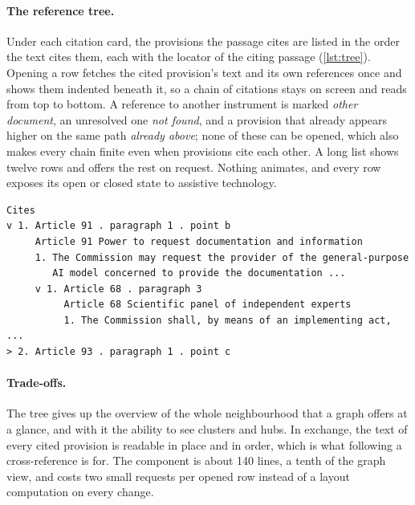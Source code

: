 \paragraph{The reference tree.} Under each citation card, the provisions the
passage cites are listed in the order the text cites them, each with the
locator of the citing passage (\cref{lst:tree}). Opening a row fetches the
cited provision's text and its own references once and shows them indented
beneath it, so a chain of citations stays on screen and reads from top to
bottom. A reference to another instrument is marked \emph{other document}, an
unresolved one \emph{not found}, and a provision that already appears higher
on the same path \emph{already above}; none of these can be opened, which also
makes every chain finite even when provisions cite each other. A long list
shows twelve rows and offers the rest on request. Nothing animates, and every
row exposes its open or closed state to assistive technology.

\begin{lstlisting}[float, numbers=none, caption={The reference tree under Article
101(1), with two levels opened (\texttt{v} open, \texttt{>} closed).},
label={lst:tree}]
Cites
v 1. Article 91 . paragraph 1 . point b
     Article 91 Power to request documentation and information
     1. The Commission may request the provider of the general-purpose
        AI model concerned to provide the documentation ...
     v 1. Article 68 . paragraph 3
          Article 68 Scientific panel of independent experts
          1. The Commission shall, by means of an implementing act, ...
> 2. Article 93 . paragraph 1 . point c
\end{lstlisting}

\paragraph{Trade-offs.} The tree gives up the overview of the whole
neighbourhood that a graph offers at a glance, and with it the ability to see
clusters and hubs. In exchange, the text of every cited provision is readable
in place and in order, which is what following a cross-reference is for. The
component is about 140 lines, a tenth of the graph view, and costs two small
requests per opened row instead of a layout computation on every change.
